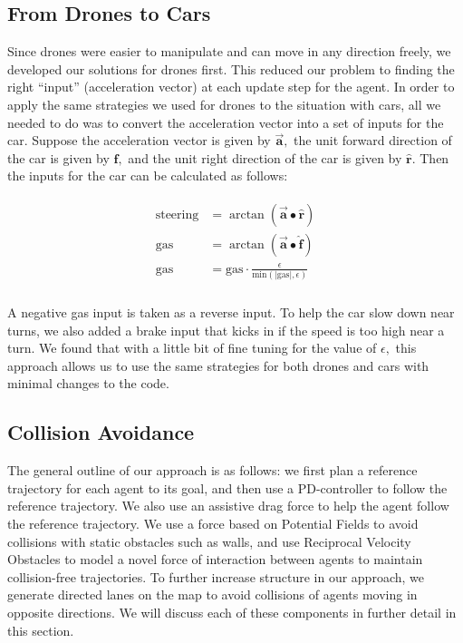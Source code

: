 \documentclass[a4paper,12pt]{article}
\begin{document}
\subsection{From Drones to Cars}
\label{method_diff}

Since drones were easier to manipulate and can move in any direction freely, we developed our solutions for drones first. This reduced our problem to finding the right ``input'' (acceleration vector) at each update step for the agent. In order to apply the same strategies we used for drones to the situation with cars, all we needed to do was to convert the acceleration vector into a set of inputs for the car. Suppose the acceleration vector is given by $\overrightarrow{\mathbf{a}},$ the unit forward direction of the car is given by $\hat{\mathbf{f}},$ and the unit right direction of the car is given by $\hat{\mathbf{r}}.$ Then the inputs for the car can be calculated as follows:

\begin{eqnarray}
  \label{eqn:car_input}
  \begin{aligned}
    \text{steering} &= \arctan(\overrightarrow{\mathbf{a}} \bullet \hat{\mathbf{r}}) \\
    \text{gas} &= \arctan(\overrightarrow{\mathbf{a}} \bullet \hat{\mathbf{f}}) \\
    \text{gas} &= \text{gas} \cdot \frac{\epsilon}{\text{min}(|\text{gas}|, \epsilon)} \\
  \end{aligned}
\end{eqnarray}

A negative gas input is taken as a reverse input. To help the car slow down near turns, we also added a brake input that kicks in if the speed is too high near a turn. We found that with a little bit of fine tuning for the value of $\epsilon,$ this approach allows us to use the same strategies for both drones and cars with minimal changes to the code.

\subsection{Collision Avoidance}
\label{method_collision}

The general outline of our approach is as follows: we first plan a reference trajectory for each agent to its goal, and then use a PD-controller to follow the reference trajectory. We also use an assistive drag force to help the agent follow the reference trajectory. We use a force based on Potential Fields to avoid collisions with static obstacles such as walls, and use Reciprocal Velocity Obstacles to model a novel force of interaction between agents to maintain collision-free trajectories. To further increase structure in our approach, we generate directed lanes on the map to avoid collisions of agents moving in opposite directions. We will discuss each of these components in further detail in this section.
\end{document}
